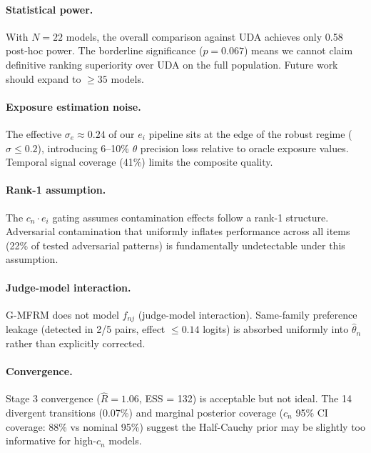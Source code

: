 \documentclass[letterpaper,11pt]{article}
\begin{document}
\paragraph{Statistical power.} With $N = 22$ models, the overall comparison against UDA achieves only 0.58 post-hoc power. The borderline significance ($p = 0.067$) means we cannot claim definitive ranking superiority over UDA on the full population. Future work should expand to $\geq 35$ models.

\paragraph{Exposure estimation noise.} The effective $\sigma_e \approx 0.24$ of our $e_i$ pipeline sits at the edge of the robust regime ($\sigma \leq 0.2$), introducing 6--10\% $\theta$ precision loss relative to oracle exposure values. Temporal signal coverage (41\%) limits the composite quality.

\paragraph{Rank-1 assumption.} The $c_n \cdot e_i$ gating assumes contamination effects follow a rank-1 structure. Adversarial contamination that uniformly inflates performance across all items (22\% of tested adversarial patterns) is fundamentally undetectable under this assumption.

\paragraph{Judge-model interaction.} G-MFRM does not model $f_{nj}$ (judge-model interaction). Same-family preference leakage (detected in 2/5 pairs, effect $\leq 0.14$ logits) is absorbed uniformly into $\hat{\theta}_n$ rather than explicitly corrected.

\paragraph{Convergence.} Stage 3 convergence ($\hat{R} = 1.06$, ESS = 132) is acceptable but not ideal. The 14 divergent transitions (0.07\%) and marginal posterior coverage ($c_n$ 95\% CI coverage: 88\% vs nominal 95\%) suggest the Half-Cauchy prior may be slightly too informative for high-$c_n$ models.
\end{document}
